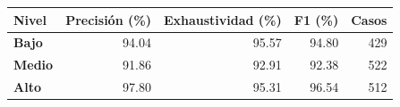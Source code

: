 \renewcommand{\arraystretch}{1.2}
\begin{tabular}{|l|r|r|r|r|}
\hline
\rowcolor{gray!20} \textbf{Nivel} & \textbf{Precisión (\%)} & \textbf{Exhaustividad (\%)} & \textbf{F1 (\%)} & \textbf{Casos} \\
\hline
\textbf{Bajo} & 94.04 & 95.57 & 94.80 & 429 \\
\hline
\textbf{Medio} & 91.86 & 92.91 & 92.38 & 522 \\
\hline
\textbf{Alto} & 97.80 & 95.31 & 96.54 & 512 \\
\hline
\end{tabular}
